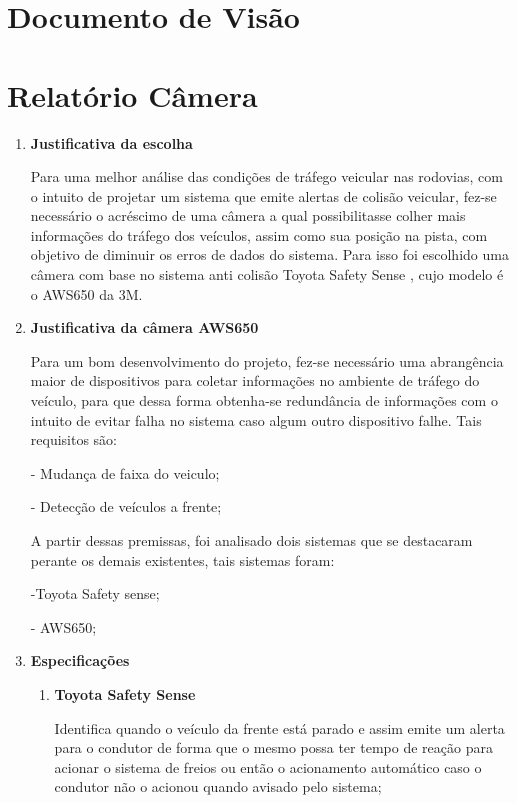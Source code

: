 \chapter{Documento de Visão}

\chapter[Relatório Câmera]{Relatório Câmera}
\begin{enumerate}
\item \textbf{Justificativa da escolha}

Para uma melhor análise das condições de tráfego veicular nas rodovias, com o
intuito de projetar um sistema que emite alertas de colisão veicular, fez-se
necessário o acréscimo de uma câmera a qual possibilitasse colher mais informações
do tráfego dos veículos, assim como sua posição na pista, com objetivo de
diminuir os erros de dados do sistema. Para isso foi escolhido uma câmera
com base no sistema anti colisão  Toyota Safety Sense \cite{toyota_safety}, cujo modelo é o AWS650 da 3M.

\item \textbf{Justificativa da câmera AWS650}

Para um bom desenvolvimento do projeto, fez-se necessário uma abrangência maior de dispositivos para coletar informações no ambiente de tráfego do veículo, para que dessa forma obtenha-se redundância de informações com o intuito de evitar falha no sistema  caso algum outro dispositivo falhe. Tais requisitos são:

-  Mudança de faixa do veiculo;

-  Detecção de veículos a frente;

A partir dessas premissas, foi analisado dois sistemas que se destacaram perante os demais existentes, tais sistemas foram:

-Toyota Safety sense;

- AWS650;

\item \textbf{Especificações}
\begin{enumerate}
\item \textbf{Toyota Safety Sense}

Identifica quando o veículo da frente está parado e assim emite um alerta para o condutor de forma que o mesmo possa ter tempo de reação para acionar o sistema de freios ou então o acionamento automático caso o condutor não o acionou quando avisado pelo sistema;


\end{enumerate}
\end{enumerate}

